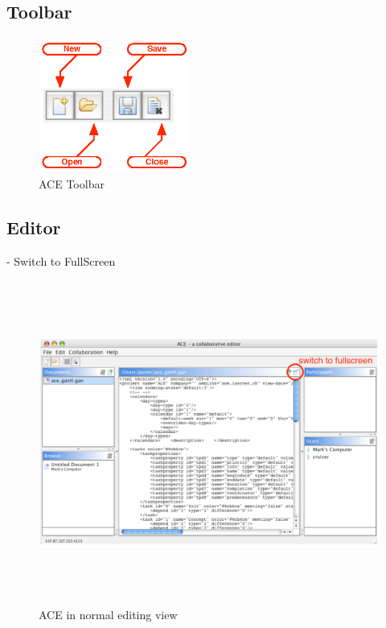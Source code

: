 \documentclass[11pt,a4paper]{article}
\begin{document}
\subsection{Toolbar}
\begin{figure}[H]
\begin{center}
  \includegraphics[height=1.74in, width=1.96in]{../images/usermanual/g_toolbar.eps}
\caption{ACE Toolbar}
\label{default}
\end{center}
\end{figure}

\subsection{Editor}
- Switch to FullScreen

\begin{figure}[H]
\begin{center}
  \includegraphics[height=4.18in, width=6.68in]{../images/usermanual/g_editor_normalscreen.eps}
\caption{ACE in normal editing view}
\label{default}
\end{center}
\end{figure}
\end{document}
